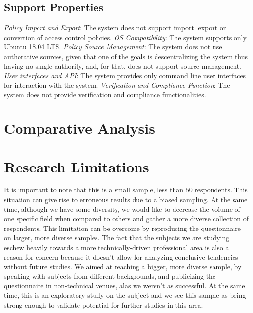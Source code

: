 \subsection{Support Properties}

\emph{Policy Import and Export}: The system does not support import, export or convertion of access control policies. \emph{OS Compatibility}: The system supports only Ubuntu 18.04 LTS. \emph{Policy Source Management}: The system does not use authorative sources, given that one of the goals is descentralizing the system thus having no single authority, and, for that, does not support source management. \emph{User interfaces and API}: The system provides only command line user interfaces for interaction with the system. \emph{Verification and Compliance Function}: The system does not provide verification and compliance functionalities.

\section{Comparative Analysis}

\section{Research Limitations}

It is important to note that this is a small sample, less than 50 respondents. This situation can give rise to erroneous results due to a biased sampling. At the same time, although we have some diversity, we would like to decrease the volume of one specific field when compared to others and gather a more diverse collection of respondents. This limitation can be overcome by reproducing the questionnaire on larger, more diverse samples. The fact that the subjects we are studying eschew heavily towards a more technically-driven professional area is also a reason for concern because it doesn't allow for analyzing conclusive tendencies without future studies. We aimed at reaching a bigger, more diverse sample, by speaking with subjects from different backgrounds, and publicizing the questionnaire in non-technical venues, alas we weren't as successful. At the same time, this is an exploratory study on the subject and we see this sample as being strong enough to validate potential for further studies in this area.

